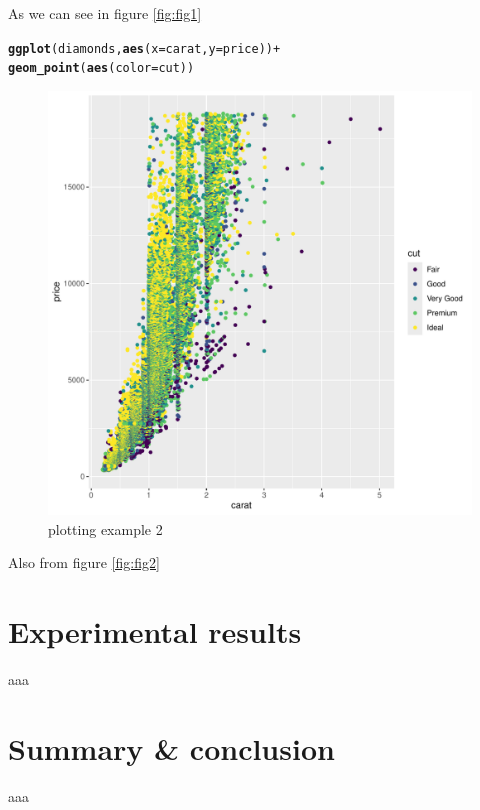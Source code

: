 \documentclass[12pt]{report}\usepackage[]{graphicx}\usepackage[]{xcolor}
\makeatletter
\newcommand{\hlopt}[1]{\textcolor[rgb]{0,0,0}{#1}}%
\newcommand{\hlstd}[1]{\textcolor[rgb]{0.345,0.345,0.345}{#1}}%
\newcommand{\hlkwc}[1]{\textcolor[rgb]{0.333,0.667,0.333}{#1}}%
\newcommand{\hlkwd}[1]{\textcolor[rgb]{0.737,0.353,0.396}{\textbf{#1}}}%
\newenvironment{kframe}{%
 \def\at@end@of@kframe{}%
 \ifinner\ifhmode%
  \def\at@end@of@kframe{\end{minipage}}%
  \begin{minipage}{\columnwidth}%
 \fi\fi%
 \def\FrameCommand##1{\hskip\@totalleftmargin \hskip-\fboxsep
 \colorbox{shadecolor}{##1}\hskip-\fboxsep
     \hskip-\linewidth \hskip-\@totalleftmargin \hskip\columnwidth}%
 \MakeFramed {\advance\hsize-\width
   \@totalleftmargin\z@ \linewidth\hsize
   \@setminipage}}%
 {\par\unskip\endMakeFramed%
 \at@end@of@kframe}
\newenvironment{knitrout}{}{} %
\makeatother
\begin{document}
As we can see in figure \ref{fig:fig1}

    \pagebreak
    
\begin{knitrout}
\color{fgcolor}\begin{kframe}
\begin{alltt}
\hlkwd{ggplot}\hlstd{(diamonds,} \hlkwd{aes}\hlstd{(}\hlkwc{x} \hlstd{= carat,} \hlkwc{y} \hlstd{= price))} \hlopt{+}
\hlkwd{geom_point}\hlstd{(}\hlkwd{aes}\hlstd{(}\hlkwc{color} \hlstd{= cut))}
\end{alltt}
\end{kframe}\begin{figure}[H]

{\centering \includegraphics[width=0.75\linewidth]{figure/unnamed-chunk-2-1} 

}

\caption{\label{fig:fig2}plotting example 2}\label{fig:unnamed-chunk-2}
\end{figure}

\end{knitrout}

Also from figure \ref{fig:fig2}

    \chapter*{Experimental results}\label{ch:sec2}

    aaa

    \chapter*{Summary \& conclusion}\label{ch:sec3}

    aaa
\end{document}
